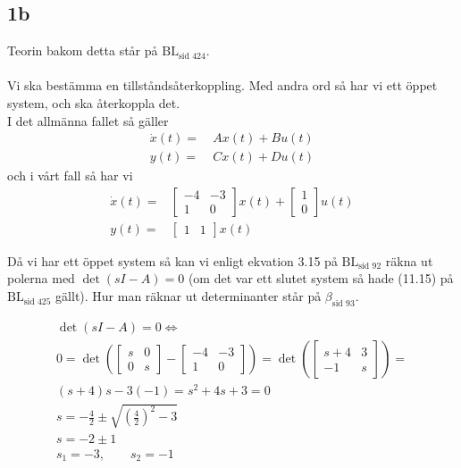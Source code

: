 \documentclass[a4paper]{article}
\newcommand{\mhb}[1]{$\beta_{\text{#1}}$}     %
\newcommand{\bl}[1]{$\text{BL}_{\text{#1}}$}  %
\begin{document}
\subsection{1b}
Teorin bakom detta står på \bl{sid 424}.\\\\

Vi ska bestämma en tillståndsåterkoppling. Med andra ord så har vi ett öppet system, och ska återkoppla det.\\

I det allmänna fallet så gäller
\begin{align*}
  \dot{x}(t) =~& Ax(t) + Bu(t) \\
  y(t) =~& Cx(t) + Du(t)
\end{align*}
och i vårt fall så har vi
\begin{align*}
  \dot{x}(t) =& \begin{bmatrix}-4 & -3 \\ 1 & 0\end{bmatrix} x(t) + \begin{bmatrix}1 \\ 0\end{bmatrix} u(t) \\
  y(t) =& \begin{bmatrix}1 & 1\end{bmatrix} x(t)
\end{align*}


Då vi har ett öppet system så kan vi enligt ekvation 3.15 på \bl{sid 92} räkna ut polerna med $\det(sI-A) = 0$ (om det var ett slutet system så hade (11.15) på \bl{sid 425} gällt). Hur man räknar ut determinanter står på \mhb{sid 93}.

\begin{align*}
  \det(sI-A) = 0 \Longleftrightarrow \\
  0 = \det \left( \begin{bmatrix}s & 0 \\ 0 & s\end{bmatrix} - \begin{bmatrix}-4 & -3 \\ 1 & 0\end{bmatrix} \right) = \det \left( \begin{bmatrix}s+4 & 3 \\ -1 & s\end{bmatrix} \right) =\\
  (s+4)s - 3(-1) = s^2 + 4s + 3 = 0\\
  s=-\frac{4}{2} \pm \sqrt{\left(\frac{4}{2}\right)^2 - 3}\\
  s=-2 \pm 1\\
  s_1=-3, \qquad s_2=-1
\end{align*}
\end{document}
